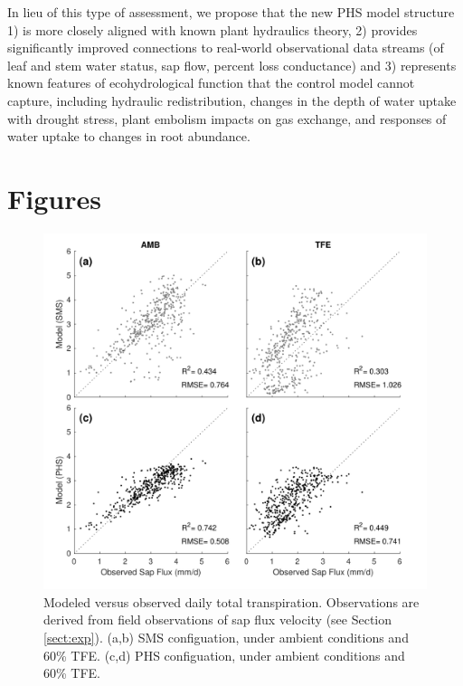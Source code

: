 \documentclass[draft,linenumbers]{agujournal}
\begin{document}
    In lieu of this type of assessment, we propose that the new PHS model structure 1) is more closely aligned with known plant hydraulics theory, 2) provides significantly improved connections to real-world observational data streams (of leaf and stem water status, sap flow, percent loss conductance) and 3) represents known features of ecohydrological function that the control model cannot capture, including hydraulic redistribution, changes in the depth of water uptake with drought stress, plant embolism impacts on gas exchange, and responses of water uptake to changes in root abundance. 
      
      
\section{Figures}

  \begin{figure}[h]
     \centering
     \includegraphics[width=30pc]{figs/T.pdf}
     \caption{Modeled versus observed daily total transpiration. Observations are derived from field observations of sap flux velocity (see Section \ref{sect:exp}).
     (a,b) SMS configuation, under ambient conditions and 60\% TFE.
     (c,d) PHS configuation, under ambient conditions and 60\% TFE.
     }
     \label{fig:t}
  \end{figure}
  
\end{document}
